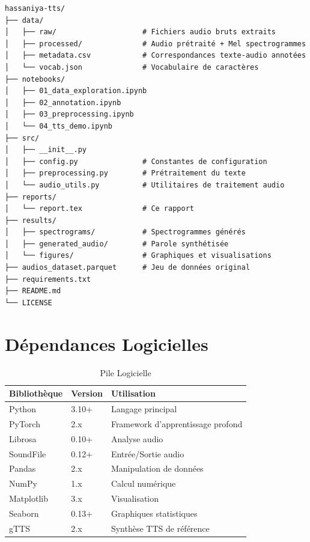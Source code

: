 \documentclass[12pt,a4paper]{article}
\begin{document}
\begin{verbatim}
hassaniya-tts/
├── data/
│   ├── raw/                    # Fichiers audio bruts extraits
│   ├── processed/              # Audio prétraité + Mel spectrogrammes
│   ├── metadata.csv            # Correspondances texte-audio annotées
│   └── vocab.json              # Vocabulaire de caractères
├── notebooks/
│   ├── 01_data_exploration.ipynb
│   ├── 02_annotation.ipynb
│   ├── 03_preprocessing.ipynb
│   └── 04_tts_demo.ipynb
├── src/
│   ├── __init__.py
│   ├── config.py               # Constantes de configuration
│   ├── preprocessing.py        # Prétraitement du texte
│   └── audio_utils.py          # Utilitaires de traitement audio
├── reports/
│   └── report.tex              # Ce rapport
├── results/
│   ├── spectrograms/           # Spectrogrammes générés
│   ├── generated_audio/        # Parole synthétisée
│   └── figures/                # Graphiques et visualisations
├── audios_dataset.parquet      # Jeu de données original
├── requirements.txt
├── README.md
└── LICENSE
\end{verbatim}

\section{Dépendances Logicielles}
\label{app:dependencies}

\begin{table}[H]
\centering
\caption{Pile Logicielle}
\begin{tabular}{lll}
\toprule
\textbf{Bibliothèque} & \textbf{Version} & \textbf{Utilisation} \\
\midrule
Python & 3.10+ & Langage principal \\
PyTorch & 2.x & Framework d'apprentissage profond \\
Librosa & 0.10+ & Analyse audio \\
SoundFile & 0.12+ & Entrée/Sortie audio \\
Pandas & 2.x & Manipulation de données \\
NumPy & 1.x & Calcul numérique \\
Matplotlib & 3.x & Visualisation \\
Seaborn & 0.13+ & Graphiques statistiques \\
gTTS & 2.x & Synthèse TTS de référence \\
\bottomrule
\end{tabular}
\end{table}
\end{document}
